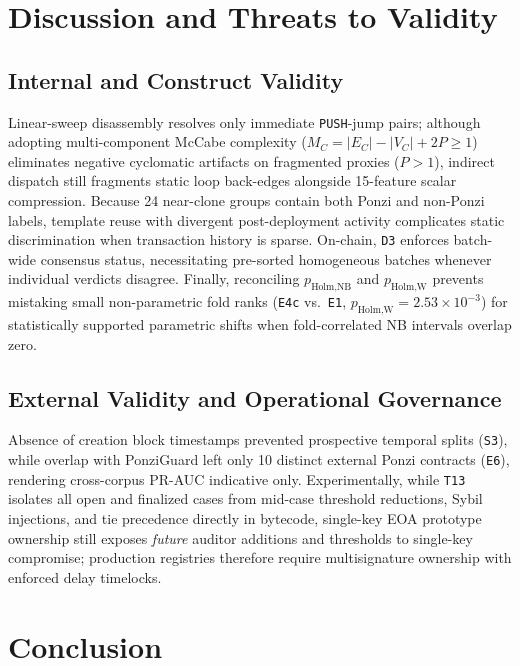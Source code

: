 \documentclass[conference]{IEEEtran}
\begin{document}
\section{Discussion and Threats to Validity}\label{sec:discussion}

\subsection{Internal and Construct Validity}\label{sec:val_internal}

Linear-sweep disassembly resolves only immediate \texttt{PUSH}-jump pairs; although adopting multi-component McCabe complexity ($M_C = |E_C|-|V_C|+2P \ge 1$) eliminates negative cyclomatic artifacts on fragmented proxies ($P > 1$), indirect dispatch still fragments static loop back-edges alongside 15-feature scalar compression. Because 24 near-clone groups contain both Ponzi and non-Ponzi labels, template reuse with divergent post-deployment activity complicates static discrimination when transaction history is sparse. On-chain, \texttt{D3} enforces batch-wide consensus status, necessitating pre-sorted homogeneous batches whenever individual verdicts disagree. Finally, reconciling $p_{\text{Holm,NB}}$ and $p_{\text{Holm,W}}$ prevents mistaking small non-parametric fold ranks (\texttt{E4c} vs.\ \texttt{E1}, $p_{\text{Holm,W}}=2.53\times 10^{-3}$) for statistically supported parametric shifts when fold-correlated NB intervals overlap zero.

\subsection{External Validity and Operational Governance}\label{sec:val_external}

Absence of creation block timestamps prevented prospective temporal splits (\texttt{S3}), while overlap with PonziGuard left only 10 distinct external Ponzi contracts (\texttt{E6}), rendering cross-corpus PR-AUC indicative only. Experimentally, while \texttt{T13} isolates all open and finalized cases from mid-case threshold reductions, Sybil injections, and tie precedence directly in bytecode, single-key EOA prototype ownership still exposes \emph{future} auditor additions and thresholds to single-key compromise; production registries therefore require multisignature ownership with enforced delay timelocks.

\section{Conclusion}\label{sec:conclusion}
\end{document}
